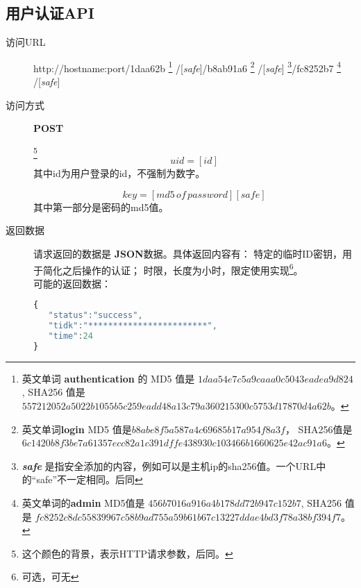 \documentclass[UTF8]{article}
\def\safe{/[\textit{safe}]}
\def\POST{\colorbox[rgb]{0.77,0.53,0.97}{\textbf{POST}}}
\def\bfJSON{\textbf{JSON}}
\def\viaurl{\item[{\quad\colorbox[rgb]{0.47,0.88,0.89}{访问URL}}]}
\def\viareq#1{\item[{\quad\colorbox[rgb]{0.57,0.88,0.99}{访问方式}}] #1}
\def\rtdata{\item[{\quad\colorbox[rgb]{0.70,0.9,0.59}{返回数据}}]}
\begin{document}
    \subsection{用户认证API}%



    \begin{description}

        \viaurl http://hostname:port/1daa62b
        \footnote{
            英文单词 \textbf{authentication} 的
            MD5 值是
            $1daa54e7c5a9caaa0c5043eadea9d824$,
            SHA256 值是
            $557212052a5022b1055b5c259eadd48a13c79a360215300c5753d17870d4a62b$。
        }
        \safe/b8ab91a6
        \footnote{
            英文单词\textbf{login}  MD5 值是$b8abe8f5a587a4c69685b17a954f8a3f$，
            SHA256值是
            $6c1420b8f3be7a61357ecc82a1c391dffe438930c103466b1660625e42ac91a6$。
        }
        \safe
        \footnote{\textit{\textbf{safe}} 是指安全添加的内容，例如可以是主机ip的sha256值。一个URL中的“safe”不一定相同。后同}/fc8252b7
        \footnote{
            英文单词的\textbf{admin}
            MD5值是 $456b7016a916a4b178dd72b947c152b7 $,
            SHA256 值是
            $fc8252c8dc55839967c58b9ad755a59b61b67c13227ddae4bd3f78a38bf394f7$。
        }
        \safe

        \viareq \POST

        \label{par:id}
        \footnote{这个颜色的背景，表示HTTP请求参数，后同。}
        $$uid=[id]$$
        其中id为用户登录的id，不强制为数字。

        \label{par:key}
         $$key=[md5\, of\, password][safe]$$
         其中第一部分是密码的md5值。

        \rtdata 请求返回的数据是 \bfJSON 数据。具体返回内容有：
        特定的临时ID密钥，用于简化之后操作的认证；
        时限，长度为小时，限定使用实现\footnote{可选，可无}。
         \\ 可能的返回数据：
        \begin{lstlisting}[language=JavaScript]
{
   "status":"success",
   "tidk":"************************",
   "time":24
}
        \end{lstlisting}


    \end{description}
\end{document}
